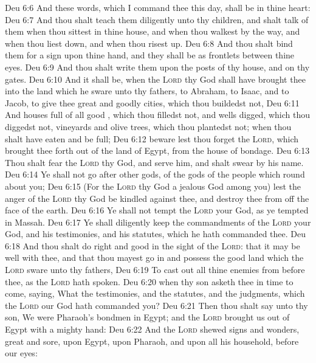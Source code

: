 \vs Deu 6:6 And these words, which I command thee this day, shall be in thine heart:
\vs Deu 6:7 And thou shalt teach them diligently unto thy children, and shalt talk of them when thou sittest in thine house, and when thou walkest by the way, and when thou liest down, and when thou risest up.
\vs Deu 6:8 And thou shalt bind them for a sign upon thine hand, and they shall be as frontlets between thine eyes.
\vs Deu 6:9 And thou shalt write them upon the posts of thy house, and on thy gates.
\vs Deu 6:10 And it shall be, when the \textsc{Lord} thy God shall have brought thee into the land which he sware unto thy fathers, to Abraham, to Isaac, and to Jacob, to give thee great and goodly cities, which thou buildedst not,
\vs Deu 6:11 And houses full of all good , which thou filledst not, and wells digged, which thou diggedst not, vineyards and olive trees, which thou plantedst not; when thou shalt have eaten and be full;
\vs Deu 6:12  beware lest thou forget the \textsc{Lord}, which brought thee forth out of the land of Egypt, from the house of bondage.
\vs Deu 6:13 Thou shalt fear the \textsc{Lord} thy God, and serve him, and shalt swear by his name.
\vs Deu 6:14 Ye shall not go after other gods, of the gods of the people which  round about you;
\vs Deu 6:15 (For the \textsc{Lord} thy God  a jealous God among you) lest the anger of the \textsc{Lord} thy God be kindled against thee, and destroy thee from off the face of the earth.
\vs Deu 6:16 Ye shall not tempt the \textsc{Lord} your God, as ye tempted  in Massah.
\vs Deu 6:17 Ye shall diligently keep the commandments of the \textsc{Lord} your God, and his testimonies, and his statutes, which he hath commanded thee.
\vs Deu 6:18 And thou shalt do  right and good in the sight of the \textsc{Lord}: that it may be well with thee, and that thou mayest go in and possess the good land which the \textsc{Lord} sware unto thy fathers,
\vs Deu 6:19 To cast out all thine enemies from before thee, as the \textsc{Lord} hath spoken.
\vs Deu 6:20  when thy son asketh thee in time to come, saying, What  the testimonies, and the statutes, and the judgments, which the \textsc{Lord} our God hath commanded you?
\vs Deu 6:21 Then thou shalt say unto thy son, We were Pharaoh's bondmen in Egypt; and the \textsc{Lord} brought us out of Egypt with a mighty hand:
\vs Deu 6:22 And the \textsc{Lord} shewed signs and wonders, great and sore, upon Egypt, upon Pharaoh, and upon all his household, before our eyes:
